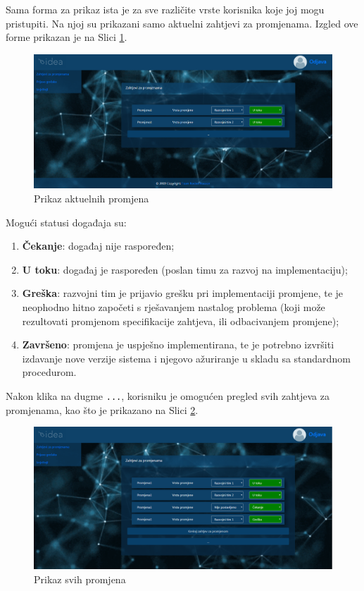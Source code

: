 \documentclass[12pt,a4paper]{article}
\begin{document}
Sama forma za prikaz ista je za sve različite vrste korisnika koje joj mogu pristupiti. Na njoj su prikazani samo aktuelni zahtjevi za promjenama. Izgled ove forme prikazan je na Slici \ref{s7}.

\begin{figure}[H]
\center
\includegraphics[scale=0.35]{../res/UI/changeActual.PNG}
\caption{Prikaz aktuelnih promjena}
\label{s7}
\end{figure}

Mogući statusi događaja su:

\begin{enumerate}
\item \textbf{Čekanje}: događaj nije raspoređen;
\item \textbf{U toku}: događaj je raspoređen (poslan timu za razvoj na implementaciju);
\item \textbf{Greška}: razvojni tim je prijavio grešku pri implementaciji promjene, te je neophodno hitno započeti s rješavanjem nastalog problema (koji može rezultovati promjenom specifikacije zahtjeva, ili odbacivanjem promjene);
\item \textbf{Završeno}: promjena je uspješno implementirana, te je potrebno izvršiti izdavanje nove verzije sistema i njegovo ažuriranje u skladu sa standardnom procedurom.
\end{enumerate}

Nakon klika na dugme \texttt{...}, korisniku je omogućen pregled svih zahtjeva za promjenama, kao što je prikazano na Slici \ref{s8}.

\begin{figure}[H]
\center
\includegraphics[scale=0.35]{../res/UI/changeAll.PNG}
\caption{Prikaz svih promjena}
\label{s8}
\end{figure}
\end{document}
